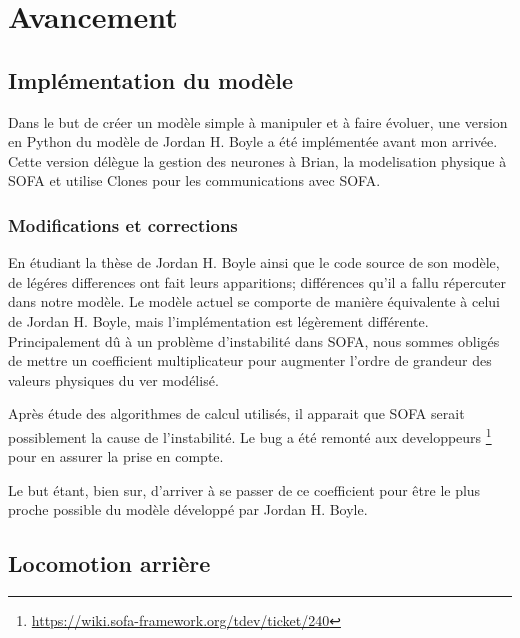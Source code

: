 \chapter{Avancement} %
\label{cha:Avancement}


\section{Implémentation du modèle} %
\label{sub:Implémentation du modèle}

Dans le but de créer un modèle simple à manipuler et à faire évoluer, une version en Python du
modèle de Jordan H. Boyle a été implémentée avant mon arrivée. Cette version délègue la gestion
des neurones à Brian, la modelisation physique à SOFA et utilise Clones pour les communications
avec SOFA.

\subsection{Modifications et corrections} %
\label{sub:Modifications et corrections}

En étudiant la thèse de Jordan H. Boyle ainsi que le code source de son modèle, de légéres differences
ont fait leurs apparitions; différences qu'il a fallu répercuter dans notre modèle.
Le modèle actuel se comporte de manière équivalente à celui de Jordan H. Boyle, mais l'implémentation
est légèrement différente. Principalement dû à un problème d'instabilité dans SOFA, nous sommes obligés
de mettre un coefficient multiplicateur pour augmenter l'ordre de grandeur des valeurs physiques du ver
modélisé.

Après étude des algorithmes de calcul utilisés, il apparait que SOFA serait possiblement la cause de
l'instabilité. Le bug a été remonté aux developpeurs
\footnote{\url{https://wiki.sofa-framework.org/tdev/ticket/240}} pour en assurer la prise en compte.

Le but étant, bien sur, d'arriver à se passer de ce coefficient pour être le plus proche possible
du modèle développé par Jordan H. Boyle.



\section{Locomotion arrière} %
\label{sec:Locomotion arrière}

